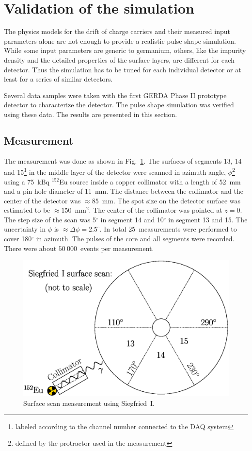 \documentclass[epj]{svjour}
\begin{document}
\section{Validation of the simulation}
\label{s:psv}
The physics models \cite{miha,bart} for the drift of charge carriers
and their measured input parameters \cite{miha,reg,bart} alone are not
enough to provide a realistic pulse shape simulation. While some input
parameters are generic to germanium, others, like the impurity density
and the detailed properties of the surface layers, are different for
each detector. Thus the simulation has to be tuned for each individual
detector or at least for a series of similar detectors.

Several data samples were taken with the first GERDA Phase II
prototype detector \cite{si} to characterize the detector. The pulse
shape simulation was verified using these data. The results are
presented in this section.

\subsection{Measurement}
\label{s:char}
The measurement was done as shown in Fig.~\ref{f:siscan}. The surfaces
of segments 13, 14 and 15\footnote{labeled according to the channel
number connected to the DAQ system} in the middle layer of the
detector were scanned in azimuth angle, $\phi$\footnote{defined by the
protractor used in the measurement} using a 75~kBq $^{152}$Eu source
inside a copper collimator with a length of 52~mm and a pin-hole
diameter of 11~mm. The distance between the collimator and the center
of the detector was $\approx 85$~mm. The spot size on the detector
surface was estimated to be $\approx 150$~mm$^{2}$. The center of the
collimator was pointed at $z = 0$. The step size of the scan was
5$^{\circ}$ in segment 14 and 10$^{\circ}$ in segment 13 and 15. The
uncertainty in $\phi$ is $\approx \Delta \phi=2.5^{\circ}$. In total
25~measurements were performed to cover 180$^{\circ}$ in azimuth. The
pulses of the core and all segments were recorded. There were about
$50\ 000$~events per measurement.
\begin{figure}[htbp]
\centering
\includegraphics[width=0.8\linewidth]{siscan}
\caption{Surface scan measurement using Siegfried~I.}
\label{f:siscan}
\end{figure}
\end{document}
